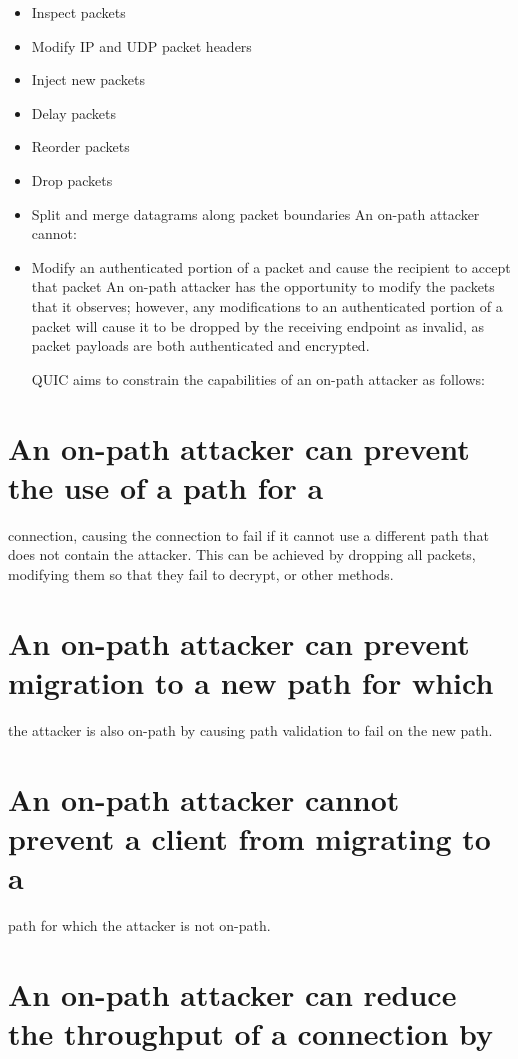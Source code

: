 \documentclass{article}
\begin{document}
\begin{itemize}
\item Inspect packets
\item Modify IP and UDP packet headers
\item Inject new packets
\item Delay packets
\item Reorder packets
\item Drop packets
\item Split and merge datagrams along packet boundaries
An on-path attacker cannot:

\item Modify an authenticated portion of a packet and cause the recipient to accept that packet
An on-path attacker has the opportunity to modify the packets that it observes; however, any modifications to an authenticated portion of a packet will cause it to be dropped by the receiving endpoint as invalid, as packet payloads are both authenticated and encrypted.

QUIC aims to constrain the capabilities of an on-path attacker as follows:

\end{itemize}
\section{An on-path attacker can prevent the use of a path for a}

connection, causing the connection to fail if it cannot use a different path that does not contain the attacker.  This can be achieved by dropping all packets, modifying them so that they fail to decrypt, or other methods.

\section{An on-path attacker can prevent migration to a new path for which}

the attacker is also on-path by causing path validation to fail on the new path.

\section{An on-path attacker cannot prevent a client from migrating to a}

path for which the attacker is not on-path.

\section{An on-path attacker can reduce the throughput of a connection by}
\end{document}
